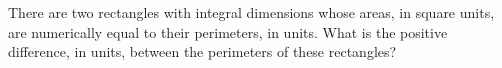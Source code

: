 There are two rectangles with integral dimensions whose areas, in square units, are numerically equal to their perimeters, in units. What is the positive difference, in units, between the perimeters of these rectangles?
